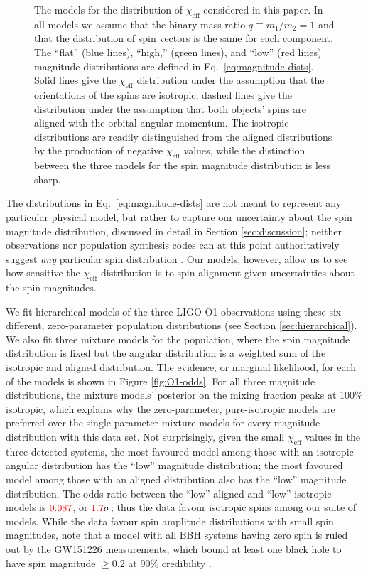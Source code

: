 \documentclass[modern,linenumbers]{aastex61}
\newcommand{\chieff}{\chi_\mathrm{eff}}
\newcommand{\checkme}[1]{\textcolor{red}{#1}}
\newcommand{\OOneSigmaIsoAligned}{\checkme{1.7}}
\newcommand{\OOneOddsIsoAligned}{\checkme{0.087}}
\begin{document}
\begin{figure}
  \caption{\label{fig:chieff-distribution-models} The models for the
    distribution of $\chieff$ considered in this paper.  In all models
    we assume that the binary mass ratio $q \equiv m_1/m_2 = 1$ and
    that the distribution of spin vectors is the same for each
    component.  The ``flat'' (blue lines), ``high,'' (green lines),
    and ``low'' (red lines) magnitude distributions are defined in
    Eq.\ \eqref{eq:magnitude-dists}.  Solid lines give the $\chieff$
    distribution under the assumption that the orientations of the
    spins are isotropic; dashed lines give the distribution under the
    assumption that both objects' spins are aligned with the orbital
    angular momentum.  The isotropic distributions are readily
    distinguished from the aligned distributions by the production of negative
    $\chieff$ values, while the distinction between the three models
    for the spin magnitude distribution is less sharp.}
\end{figure}

The distributions in Eq.\ \eqref{eq:magnitude-dists} are not meant to
represent any particular physical model, but rather to capture our
uncertainty about the spin magnitude distribution, discussed in detail
in Section \ref{sec:discussion}; neither observations nor population
synthesis codes can at this point authoritatively suggest \emph{any}
particular spin distribution \citep{2015PhR...548....1M}.  Our models,
however, allow us to see how sensitive the $\chieff$ distribution is
to spin alignment given uncertainties about the spin magnitudes.

We fit hierarchical models of the three LIGO O1 observations using
these six different, zero-parameter population distributions (see
Section \ref{sec:hierarchical}).  We also fit three mixture models for
the population, where the spin magnitude distribution is fixed but the
angular distribution is a weighted sum of the isotropic and aligned
distribution.  The evidence, or marginal likelihood, for each of the
models is shown in Figure \ref{fig:O1-odds}.  For all three magnitude
distributions, the mixture models' posterior on the mixing fraction
peaks at 100\% isotropic, which explains why the zero-parameter,
pure-isotropic models are preferred over the single-parameter mixture
models for every magnitude distribution with this data set.  Not
surprisingly, given the small $\chieff$ values in the three detected
systems, the most-favoured model among those with an isotropic angular
distribution has the ``low'' magnitude distribution; the most favoured
model among those with an aligned distribution also has the ``low''
magnitude distribution.  The odds ratio between the ``low'' aligned
and ``low'' isotropic models is $\OOneOddsIsoAligned$, or
$\OOneSigmaIsoAligned\sigma$; thus the data favour isotropic spins
among our suite of models.  While the data favour spin amplitude
distributions with small spin magnitudes, note that a model with all
\ac{BBH} systems having zero spin is ruled out by the GW151226
measurements, which bound at least one black hole to have spin
magnitude $\geq 0.2$ at 90\% credibility \citep{2016PhRvL.116x1103A}.
\end{document}
